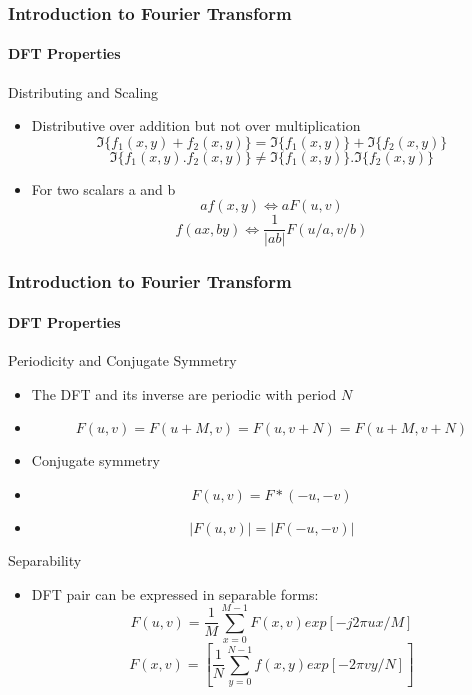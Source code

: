 \documentclass{beamer}
\begin{document}
\begin{frame}
\frametitle{Introduction to Fourier Transform}
\framesubtitle{DFT Properties}
\begin{block}{Distributing and Scaling}
\scriptsize{
\begin{itemize}
\item Distributive over addition but not over multiplication
$$\Im\lbrace f_{1}(x,y)+f_{2}(x,y)\rbrace = \Im\lbrace f_{1}(x,y) \rbrace +\Im\lbrace f_{2}(x,y)\rbrace $$ 
$$\Im\lbrace f_{1}(x,y).f_{2}(x,y)\rbrace \neq \Im\lbrace f_{1}(x,y) \rbrace .\Im\lbrace f_{2}(x,y)\rbrace $$ 
\item For two scalars a and b 
$$ af(x,y)\Leftrightarrow aF(u,v) $$ 
$$ f(ax,by) \Leftrightarrow \frac{1}{\vert ab \vert} F(u/a, v/b)$$ 
\end{itemize}
}
\end{block}
\end{frame}
\begin{frame}
\frametitle{Introduction to Fourier Transform}
\framesubtitle{DFT Properties}
\begin{block}{Periodicity and Conjugate Symmetry}
\tiny{
\begin{itemize}
\item The DFT and its inverse are periodic with period $N$
\item[] $$F(u,v) = F(u+M,v) = F(u, v+N) = F(u+M, v+N) $$ 
\item Conjugate symmetry
\item[] $$ F(u,v) = F*(-u,-v)$$ 
\item[] $$ \vert F(u,v) \vert = \vert F(-u,-v)\vert $$
\end{itemize}
}
\end{block}
\begin{block}{Separability}
\tiny{
\begin{itemize}
\item DFT pair can be expressed in separable forms: 
$$F(u,v) = \frac{1}{M}\sum^{M-1}_{x=0} F(x,v) exp[-j2\pi ux/M]$$
$$F(x,v) = \left[ \frac{1}{N}\sum^{N-1}_{y =0} f(x,y)exp[-2\pi vy/N]\right]$$
\end{itemize}}
\end{block}
\end{frame}
\end{document}
